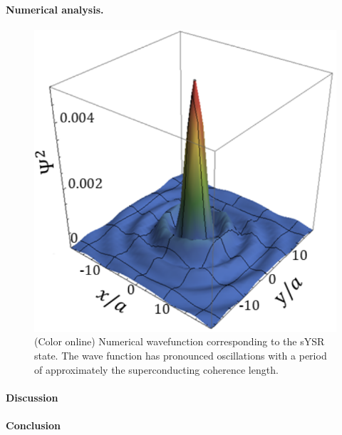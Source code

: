 \documentclass[twocolumn,showpacs,floatfix,nofootinbib,longbibliography]{revtex4-1}
\begin{document}
\paragraph*{Numerical analysis.} \label{sec:numerics} 

\begin{figure} \centering
\includegraphics[width=0.7\linewidth]{WaveFunction}  
\caption{(Color online) Numerical wavefunction corresponding to the sYSR state. The wave function has pronounced oscillations with a period of approximately the superconducting coherence length.  } \label{fig:wavefunction}
\end{figure}

\paragraph*{Discussion  } \label{sec:discussion} 



\paragraph*{Conclusion} \label{sec:conclusion}
\end{document}
